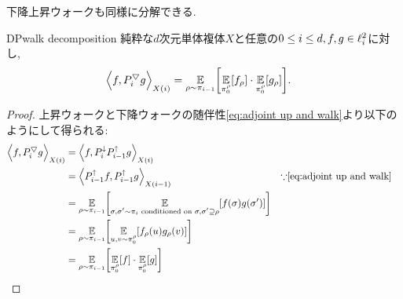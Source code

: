 下降上昇ウォークも同様に分解できる.
\begin{lemma}{}{DPwalk decomposition}
    純粋な$d$次元単体複体$X$と任意の$0\le i\le d,f,g\in \ell^2_{i}$に対し,
    \begin{align*}
        \iprod{f,\PDU_i g}&= \E_{\rho\sim \pi_{i-1}}\sbra*{ \E_{\pi^\rho_0}[f_\rho] \cdot \E_{\pi^\rho_0}[g_\rho] }.
    \end{align*}
\end{lemma}
\begin{proof}
上昇ウォークと下降ウォークの随伴性\cref{eq:adjoint up and walk}より以下のようにして得られる:
    \begin{align*}
        \iprod{f,\PDU_i g} &= \iprod{f,\Pdown_i \Pup_{i-1} g} \\
        &= \iprod[i-1]{\Pup_{i-1}f, \Pup_{i-1}g } & & \text{$\because$\cref{eq:adjoint up and walk}} \\
        &= \E_{\rho \sim \pi_{i-1}}\sbra*{ \E_{\substack{ \sigma,\sigma'\sim \pi_i\text{ conditioned on }\sigma,\sigma'\supseteq \rho }}\sbra*{f(\sigma)g(\sigma')} } \\
        &= \E_{\rho \sim \pi_{i-1}}\sbra*{ \E_{u,v\sim \pi^\rho_0}\sbra*{ f_\rho(u) g_\rho(v)} } \\
        &= \E_{\rho\sim\pi_{i-1}}\sbra*{ \E_{\pi^\rho_0}[f]\cdot \E_{\pi^\rho_0}[g] }
    \end{align*}
\end{proof}

